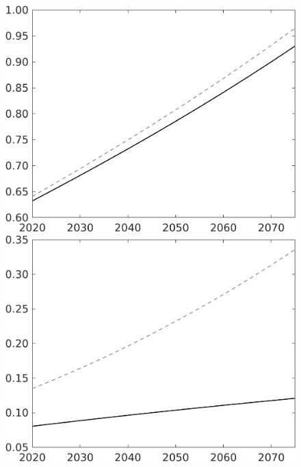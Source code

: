 \documentclass[12pt]{article}
\begin{document}
\begin{figure}[h!!]
\begin{minipage}[]{0.32\textwidth}
	\end{minipage}	
	\begin{minipage}[]{0.32\textwidth}
		\includegraphics[width=1\textwidth]{../../codding_model/own_basedOnFried/optimalPol_010922_revision/figures/all_13Sept22/LevTaufNoTauf_TaulCalib_regime0_C_spillover0_nsk0_xgr0_knspil1_sep1_LFlimit0_emsbase0_countec0_GovRev0_etaa0.79_lgd0.png}
	\end{minipage}	
	\begin{minipage}[]{0.32\textwidth}
		\includegraphics[width=1\textwidth]{../../codding_model/own_basedOnFried/optimalPol_010922_revision/figures/all_13Sept22/LevTaufNoTauf_TaulCalib_regime0_F_spillover0_nsk0_xgr0_knspil1_sep1_LFlimit0_emsbase0_countec0_GovRev0_etaa0.79_lgd0.png}

\end{minipage}
\end{figure}
\end{document}

